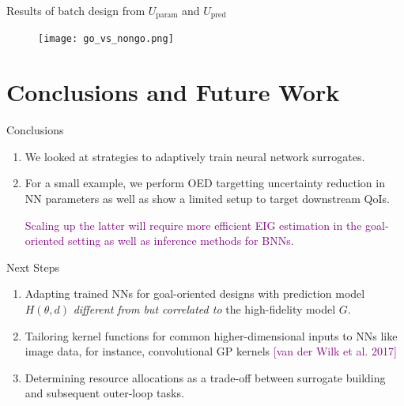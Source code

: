 \documentclass[usenames,dvipsnames,aspectratio=169]{beamer}
\theoremstyle{definition}
\begin{document}
\begin{frame}{Results of batch design from $U_{\text{param}}$ and $U_{\text{pred}}$}
    \begin{figure}
        \centering
        \texttt{[image: go\_vs\_nongo.png]}
    \end{figure}
\end{frame}


\section{Conclusions and Future Work}
\begin{frame}{Conclusions}

\begin{enumerate}
    \item We looked at strategies to adaptively train neural network surrogates.
    
    \item For a small example, we perform OED targetting uncertainty reduction in NN parameters as well as show a limited setup to target downstream QoIs.
    
    \textcolor{purple}{Scaling up the latter will require more efficient EIG estimation in the goal-oriented setting as well as inference methods for BNNs.}
    
\end{enumerate}
\end{frame}

\begin{frame}{Next Steps}
\begin{enumerate}
    \item Adapting trained NNs for goal-oriented designs with prediction model $H(\theta, d)$ \emph{different from but correlated to} the high-fidelity model $G$.

    \item Tailoring kernel functions for common higher-dimensional inputs to NNs like image data, for instance, convolutional GP kernels \textcolor{purple}{[van der Wilk et al. 2017]}
    
    \item Determining resource allocations as a trade-off between surrogate building and subsequent outer-loop tasks.\footnotemark
    
\end{enumerate}
\end{frame}
\end{document}
